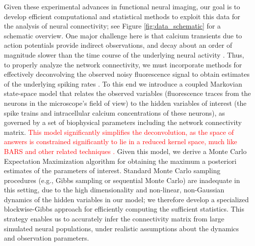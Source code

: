 \documentclass[aoas,preprint]{imsart}
\providecommand{\tr}[1]{\textcolor{red}{#1}}
\begin{document}
Given these experimental advances in functional neural imaging, our goal is to develop efficient computational and statistical methods to exploit this data for the analysis of neural connectivity; see Figure \ref{fig:data_schematic} for a schematic overview. One major challenge here is that calcium transients due to action potentials provide indirect observations, and decay about an order of magnitude slower than the time course of the underlying neural activity \cite{ImagingManual,Roxin08}. Thus, to properly analyze the network connectivity, we must incorporate methods for effectively deconvolving the observed noisy fluorescence signal to obtain estimates of the underlying spiking rates \cite{YaksiFriedrich06,GreenbergKerr08,Vogelstein2009}. To this end we introduce a coupled Markovian state-space model that relates the observed variables (fluorescence traces from the neurons in the microscope's field of view) to the hidden variables of interest (the spike trains and intracellular calcium concentrations of these neurons), as governed by a set of biophysical parameters including the network connectivity matrix.  \tr{This model significantly simplifies the deconvolution, as the space of answers is constrained significantly to lie in a reduced kernel space, much like BARS and other related techniques \cite{DimatteoKass01}.}  Given this model, we derive a Monte Carlo Expectation Maximization algorithm for obtaining the maximum a posteriori estimates of the parameters of interest. Standard Monte Carlo sampling procedures (e.g., Gibbs sampling or sequential Monte Carlo) are inadequate in this setting, due to the high dimensionality and non-linear, non-Gaussian dynamics of the hidden variables in our model; we therefore develop a specialized blockwise-Gibbs approach for efficiently computing the sufficient statistics. This strategy enables us to accurately infer the connectivity matrix from large simulated neural populations, under realistic assumptions about the dynamics and observation parameters.
\end{document}
